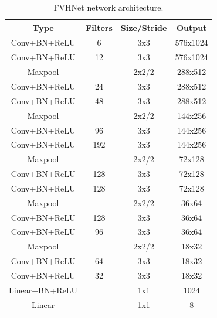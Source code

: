 \begin{table}[htb]
    \caption{FVHNet network architecture.}\label{tab:FVHNet network architecture}
    \renewcommand{\arraystretch}{1.2}
    \center
    \begin{tabular}{|c|c|c|c|}%
        \hline %
        Type & Filters & Size/Stride & Output \\
        \hline %
        Conv+BN+ReLU   &    6  &   3x3      & 576x1024  \\
        \hline
        Conv+BN+ReLU   &    12  &   3x3      & 576x1024  \\
        \hline
        Maxpool        &        &   2x2/2    & 288x512  \\
        \hline
        Conv+BN+ReLU   &    24  &   3x3      & 288x512  \\
        \hline
        Conv+BN+ReLU   &    48  &   3x3      & 288x512  \\
        \hline
        Maxpool        &        &   2x2/2    & 144x256  \\
        \hline
        Conv+BN+ReLU   &    96  &   3x3      & 144x256  \\
        \hline
        Conv+BN+ReLU   &    192  &   3x3      & 144x256  \\
        \hline
        Maxpool        &        &   2x2/2    & 72x128  \\
        \hline
        Conv+BN+ReLU   &    128  &   3x3      & 72x128 \\
        \hline
        Conv+BN+ReLU   &    128  &   3x3      & 72x128 \\
        \hline
        Maxpool        &        &   2x2/2    & 36x64  \\
        \hline
        Conv+BN+ReLU   &    128  &   3x3      & 36x64  \\
        \hline
        Conv+BN+ReLU   &    96  &   3x3      & 36x64  \\
        \hline
        Maxpool        &        &   2x2/2    & 18x32  \\
        \hline
        Conv+BN+ReLU   &    64  &   3x3      & 18x32  \\
        \hline
        Conv+BN+ReLU   &    32  &   3x3      & 18x32  \\
        \hline
        Linear+BN+ReLU &        &   1x1      & 1024  \\
        \hline
        Linear         &        &   1x1      & 8  \\
        \hline
    \end{tabular}
\end{table}

